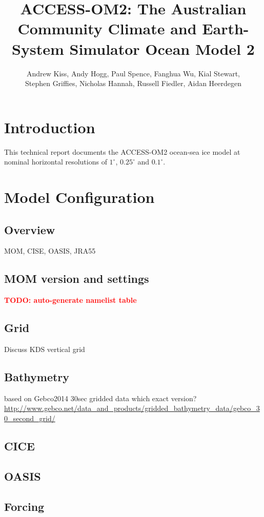 \documentclass[11pt]{report}
\title{ACCESS-OM2: The Australian Community Climate and Earth-System Simulator Ocean Model 2}
\author{Andrew Kiss, Andy Hogg, Paul Spence, Fanghua Wu, Kial Stewart,\\ Stephen Griffies, Nicholas Hannah, Russell Fiedler, Aidan Heerdegen}
\date{\textsf{The latest version of this document is available from:\TODO{add link to github!}\\
\hfill{\footnotesize This version: typeset \today\ \DTMcurrenttime\ \DTMcurrentzone \\ \ifthenelse{\equal{\gitRoff}{}}{}{\gitRoff commits since release \gitRel \\} 
\hfill git hash: \gitAbbrevHash\ \gitDirty\ committed by \gitCommitterName , \gitCommitterIsoDate\ \\
\hfill\textbf{NB: this hash does not reflect any uncommitted changes to this document.}}}\\
\raggedright{\vspace{10ex}
FOR CONTRIBUTORS\\
\begin{itemize}
\item to make git diffs easier, please write each sentence on a separate line
\end{itemize}
}}
\newcommand{\TODO}[1]{\textcolor{red}{\textsf{\textbf{TODO: #1}}}}
\begin{document}
\maketitle

\tableofcontents
\listoffigures

\section{Introduction}
This technical report documents the ACCESS-OM2 ocean-sea ice model at nominal horizontal resolutions of $1^\circ$, $0.25^\circ$ and $0.1^\circ$.

\section{Model Configuration}

\subsection{Overview}
MOM, CISE, OASIS, JRA55

\subsection{MOM version and settings}
\TODO{auto-generate namelist table}

\subsection{Grid}

Discuss KDS vertical grid

\subsection{Bathymetry}
based on Gebco2014 30sec gridded data %
which exact version? \url{http://www.gebco.net/data_and_products/gridded_bathymetry_data/gebco_30_second_grid/}

\subsection{CICE}

\subsection{OASIS}

\subsection{Forcing}
\end{document}
